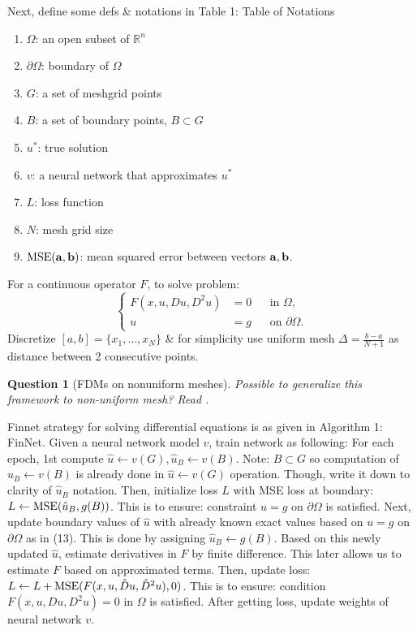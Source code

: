 \documentclass{article}
\newtheorem{question}{Question}
\begin{document}
\begin{itemize}
	Next, define some defs \& notations in {\sf Table 1: Table of Notations}
	\begin{enumerate}
		\item $\Omega$: an open subset of $\mathbb{R}^n$
		\item $\partial\Omega$: boundary of $\Omega$
		\item $G$: a set of meshgrid points
		\item $B$: a set of boundary points, $B\subset G$
		\item $u^*$: true solution
		\item $v$: a neural network that approximates $u^*$
		\item $L$: loss function
		\item $N$: mesh grid size
		\item ${\rm MSE}({\bf a},{\bf b})$: mean squared error between vectors ${\bf a},{\bf b}$.
	\end{enumerate}
	For a continuous operator $F$, to solve problem:
	\begin{equation*}
		\left\{\begin{split}
			F(x,u,Du,D^2u) &= 0&&\mbox{in }\Omega,\\
			u &= g&&\mbox{on }\partial\Omega.
		\end{split}\right.
	\end{equation*}
	Discretize $[a,b] = \{x_1,\ldots,x_N\}$ \& for simplicity use uniform mesh $\Delta =  \frac{b - a}{N + 1}$ as distance between 2 consecutive points.
	\begin{question}[FDMs on nonuniform meshes]
		Possible to generalize this framework to non-uniform mesh? Read \cite{LeVeque2007}.
	\end{question}
	Finnet strategy for solving differential equations is as given in {\sf Algorithm 1: FinNet}. Given a neural network model $v$, train network as following: For each epoch, 1st compute $\hat{u}\leftarrow v(G),\hat{u}_B\leftarrow v(B)$. Note: $B\subset G$ so computation of $\hat{u}_B\leftarrow v(B)$ is already done in $\hat{u}\leftarrow v(G)$ operation. Though, write it down to clarity of $\hat{u}_B$ notation. Then, initialize loss $L$ with MSE loss at boundary: $L\leftarrow{\rm MSE}(\hat{u}_B,g(B))$. This is to ensure: constraint $u = g$ on $\partial\Omega$ is satisfied. Next, update boundary values of $\hat{u}$ with already known exact values based on $u = g$ on $\partial\Omega$ as in (13). This is done by assigning $\hat{u}_B\leftarrow g(B)$. Based on this newly updated $\hat{u}$, estimate derivatives in $F$ by finite difference. This later allows us to estimate $F$ based on approximated terms. Then, update loss: $L\leftarrow L + {\rm MSE}(F(x,u,\hat{D}u,\hat{D}^2u),0)$. This is to ensure: condition $F(x,u,Du,D^2u) = 0$ in $\Omega$ is satisfied. After getting loss, update weights of neural network $v$.
	

\end{itemize}
\end{document}
